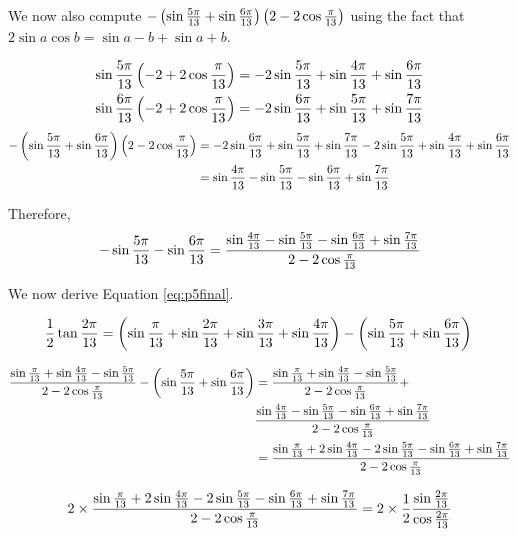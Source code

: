 \documentclass[10pt]{../usamts}
\begin{document}
\begin{solution}{5}
We now also compute $-\left( \sin{{\frac{5\pi}{13}}} + \sin{{\frac{6\pi}{13}}} \right)\left( 2 - 2\cos{{\frac{\pi}{13}}} \right)$ using the fact that $2\sin{a}\cos{b} = \sin{a-b} + \sin{a+b}$.

\begin{align*}
    \sin{{\frac{5\pi}{13}}}\left( -2 + 2\cos{{\frac{\pi}{13}}} \right) &= -2\sin{{\frac{5\pi}{13}}} + \sin{{\frac{4\pi}{13}}} + \sin{{\frac{6\pi}{13}}} \\
    \sin{{\frac{6\pi}{13}}}\left( -2 + 2\cos{{\frac{\pi}{13}}} \right) &= -2\sin{{\frac{6\pi}{13}}} + \sin{{\frac{5\pi}{13}}} + \sin{{\frac{7\pi}{13}}}
\end{align*}
\begin{align*}
    -\left( \sin{{\frac{5\pi}{13}}} + \sin{{\frac{6\pi}{13}}} \right)\left( 2 - 2\cos{{\frac{\pi}{13}}} \right)
    &= -2\sin{{\frac{6\pi}{13}}} + \sin{{\frac{5\pi}{13}}} + \sin{{\frac{7\pi}{13}}} -2\sin{{\frac{5\pi}{13}}} + \sin{{\frac{4\pi}{13}}} + \sin{{\frac{6\pi}{13}}} \\
    &= \sin{{\frac{4\pi}{13}}} - \sin{{\frac{5\pi}{13}}} -\sin{{\frac{6\pi}{13}}} + \sin{{\frac{7\pi}{13}}}
\end{align*}

Therefore,
\[
-\sin{{\frac{5\pi}{13}}} -\sin{{\frac{6\pi}{13}}} = \frac{\sin{{\frac{4\pi}{13}}} - \sin{{\frac{5\pi}{13}}} -\sin{{\frac{6\pi}{13}}} + \sin{{\frac{7\pi}{13}}}}{2 - 2 \cos{{\frac{\pi}{13}}}}
\]

We now derive Equation \ref{eq:p5final}.

\begin{equation*}
    \frac{1}{2} \tan{{\frac{2\pi}{13}}} = \left( \sin{{\frac{\pi}{13}}} + \sin{{\frac{2\pi}{13}}} + \sin{{\frac{3\pi}{13}}} + \sin{{\frac{4\pi}{13}}} \right) - \left( \sin{{\frac{5\pi}{13}}} + \sin{{\frac{6\pi}{13}}} \right) \\
\end{equation*}

\begin{align*}
    \frac{\sin{{\frac{\pi}{13}}} + \sin{{\frac{4\pi}{13}}} - \sin{{\frac{5\pi}{13}}}} {2 - 2\cos{{\frac{\pi}{13}}}}
    -\left( \sin{{\frac{5\pi}{13}}} + \sin{{\frac{6\pi}{13}}} \right)
    &= \frac{\sin{{\frac{\pi}{13}}} + \sin{{\frac{4\pi}{13}}} - \sin{{\frac{5\pi}{13}}}} {2 - 2\cos{{\frac{\pi}{13}}}} +\\
    & \frac{\sin{{\frac{4\pi}{13}}} - \sin{{\frac{5\pi}{13}}} -\sin{{\frac{6\pi}{13}}} + \sin{{\frac{7\pi}{13}}}} {2 - 2\cos{{\frac{\pi}{13}}}} \\
    &= \frac{\sin{{\frac{\pi}{13}}} + 2\sin{{\frac{4\pi}{13}}} - 2\sin{{\frac{5\pi}{13}}} - \sin{{\frac{6\pi}{13}}} + \sin{{\frac{7\pi}{13}}}} {2 - 2\cos{{\frac{\pi}{13}}}} \\
\end{align*}

\begin{equation*}
    2 \times \frac{\sin{{\frac{\pi}{13}}} + 2\sin{{\frac{4\pi}{13}}} - 2\sin{{\frac{5\pi}{13}}} - \sin{{\frac{6\pi}{13}}} + \sin{{\frac{7\pi}{13}}}} {2 - 2\cos{{\frac{\pi}{13}}}}
    = 2 \times \frac{1}{2} \frac{\sin{{\frac{2\pi}{13}}}}{\cos{{\frac{2\pi}{13}}}} \\
\end{equation*}


\end{solution}
\end{document}

